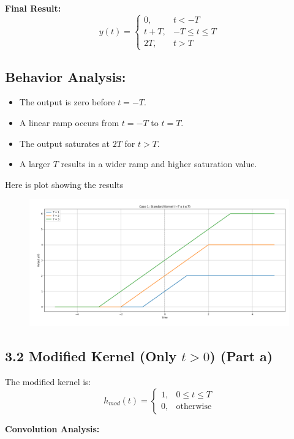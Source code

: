 \textbf{Final Result:}
\begin{equation}
y(t) = 
\begin{cases} 
0, & t < -T \\
t + T, & -T \leq t \leq T \\
2T, & t > T 
\end{cases}
\end{equation}

\subsection*{Behavior Analysis:}
\begin{itemize}
    \item The output is zero before \( t = -T \).
    \item A linear ramp occurs from \( t = -T \) to \( t = T \).
    \item The output saturates at \( 2T \) for \( t > T \).
    \item A larger \( T \) results in a wider ramp and higher saturation value.
\end{itemize}
Here is plot showing the results
\begin{figure}[H]
    \centering
    \includegraphics[width=0.8\linewidth]{plotsstep/case1step.png}
    \label{fig:enter-label}
\end{figure}
\subsection*{3.2 Modified Kernel (Only \( t > 0 \)) (Part a)}

The modified kernel is:
\begin{equation}
h_{mod}(t) = 
\begin{cases} 
1, & 0 \leq t \leq T \\
0, & \text{otherwise}
\end{cases}
\end{equation}

\textbf{Convolution Analysis:}

